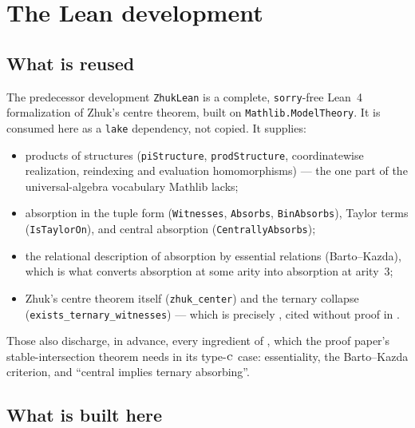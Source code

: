 \section{The Lean development}\label{sec:formalization}

\subsection{What is reused}\label{sec:reuse}

The predecessor development \texttt{ZhukLean} is a complete, \texttt{sorry}-free
Lean~4 formalization of Zhuk's centre theorem, built on
\texttt{Mathlib.ModelTheory}. It is consumed here as a \texttt{lake} dependency,
not copied. It supplies:

\begin{itemize}\tightlist
\item products of structures (\texttt{piStructure}, \texttt{prodStructure},
  coordinatewise realization, reindexing and evaluation homomorphisms) --- the
  one part of the universal-algebra vocabulary Mathlib lacks;
\item absorption in the tuple form (\texttt{Witnesses}, \texttt{Absorbs},
  \texttt{BinAbsorbs}), Taylor terms (\texttt{IsTaylorOn}), and central
  absorption (\texttt{CentrallyAbsorbs});
\item the relational description of absorption by essential relations
  (Barto--Kazda), which is what converts absorption at some arity into
  absorption at arity~$3$;
\item Zhuk's centre theorem itself (\texttt{zhuk\_center}) and the ternary
  collapse (\texttt{exists\_ternary\_\brk witnesses}) --- which is precisely
  , cited without proof in \cite{ZhukSimplified}.
\end{itemize}

Those also discharge, in advance, every ingredient of \cite[Lem.~6.11]{ZhukStrong},
which the proof paper's stable-intersection theorem needs in its type-$\textup{\textsc{c}}$
case: essentiality, the Barto--Kazda criterion, and ``central implies ternary
absorbing''.

\subsection{What is built here}\label{sec:built}

